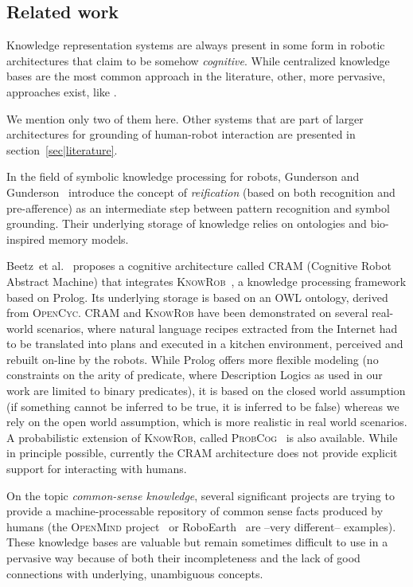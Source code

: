 \documentclass{svmult}
\newcommand{\etal}{et al.\xspace}
\begin{document}
\subsection{Related work}

Knowledge representation systems are always present in some form in robotic
architectures that claim to be somehow \emph{cognitive}. While centralized
knowledge bases are the most common approach in the literature, other, more
pervasive, approaches exist, like \cite{Jacobsson2008}.

We mention only two of them here. Other systems that are part of larger
architectures for grounding of human-robot interaction are presented in
section~\ref{sec|literature}.

In the field of symbolic knowledge processing for robots, Gunderson and
Gunderson~\cite{Gunderson2008} introduce the concept of \emph{reification}
(based on both recognition and pre-afference) as an intermediate step between
pattern recognition and symbol grounding. Their underlying storage of knowledge
relies on ontologies and bio-inspired memory models.

Beetz~\etal~\cite{Beetz2010} proposes a cognitive architecture called
\textsc{CRAM} (Cognitive Robot Abstract Machine) that integrates
\textsc{KnowRob}~\cite{Tenorth2009a}, a knowledge processing framework based on
Prolog. Its underlying storage is based on an OWL ontology, derived from
\textsc{OpenCyc}. \textsc{CRAM} and \textsc{KnowRob} have been demonstrated on
several real-world scenarios, where natural language recipes extracted from the
Internet had to be translated into plans and executed in a kitchen environment,
perceived and rebuilt on-line by the robots. While Prolog offers more flexible
modeling (no constraints on the arity of predicate, where Description Logics as
used in our work are limited to binary predicates), it is based on the closed
world assumption (if something cannot be inferred to be true, it is inferred to
be false) whereas we rely on the open world assumption, which is more realistic
in real world scenarios. A probabilistic extension of \textsc{KnowRob}, called
\textsc{ProbCog}~\cite{Jain2009} is also available. While in principle
possible, currently the CRAM architecture does not provide explicit support for
interacting with humans.

On the topic \emph{common-sense knowledge}, several significant projects are
trying to provide a machine-processable repository of common sense facts
produced by humans (the \textsc{OpenMind} project~\cite{Singh2002} or
RoboEarth~\cite{Waibel2011} are --very different-- examples). These knowledge
bases are valuable but remain sometimes difficult to use in a pervasive way
because of both their incompleteness and the lack of good connections with
underlying, unambiguous concepts.
\end{document}
